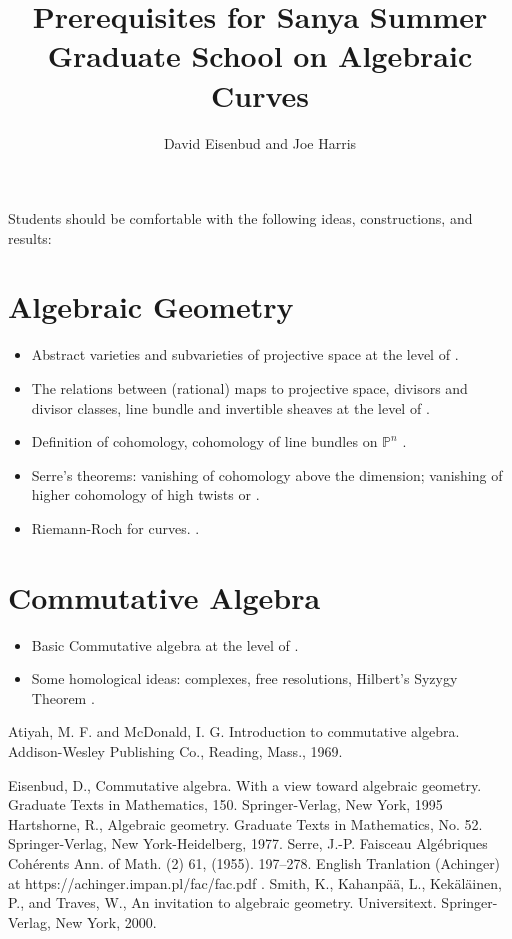 \documentclass[12pt, leqno]{report}
\title{Prerequisites for Sanya Summer Graduate School on Algebraic Curves}
\author{ David Eisenbud and Joe Harris}
\makeatletter
\def\PP{{\mathbb P}}
\def@{\mskip1.5mu} %
\makeatother
\begin{document}
\maketitle

\setcounter{page}{5}

Students should be comfortable with the following ideas, constructions, and results:

\section*{Algebraic Geometry}

\begin{itemize}
\item Abstract varieties and subvarieties of projective space at the level of \cite[Chapters 1--3 ]{S}.
\item The relations between (rational) maps to projective space, divisors and divisor classes, line bundle and invertible sheaves at the level of \cite[Chapter 8 and Appendix]{S}.
\item Definition of cohomology, cohomology of line bundles on $\PP^{n}$ \cite{FAC}.
\item Serre's theorems: vanishing of cohomology above the dimension; vanishing of higher cohomology of high twists \cite{FAC} or \cite[Ch 3]{H}.
\item Riemann-Roch for curves. \cite[Section IV.1]{H}.
\end{itemize}

\section*{Commutative Algebra}
\begin{itemize}
\item Basic Commutative algebra at the level of \cite{A}.
\item Some homological ideas: complexes, free resolutions,  Hilbert's Syzygy Theorem \cite[Chapter 1]{E}.
\end{itemize}

\begin{thebibliography}{99}
 Atiyah, M. F. and McDonald, I. G. Introduction to commutative algebra. Addison-Wesley Publishing Co., Reading, Mass., 1969.

 Eisenbud, D., Commutative algebra. With a view toward algebraic geometry. Graduate Texts in Mathematics, 150. Springer-Verlag, New York, 1995
 Hartshorne, R., Algebraic geometry. Graduate Texts in Mathematics, No. 52. Springer-Verlag, New York-Heidelberg, 1977.
 Serre, J.-P. Faisceau Alg\'ebriques Coh\'erents
Ann. of Math. (2) 61, (1955). 197--278. English Tranlation (Achinger) at https://achinger.impan.pl/fac/fac.pdf .
 Smith, K., Kahanp\"a\"a, L., Kek\"al\"ainen, P., and Traves, W., An invitation to algebraic geometry. Universitext. Springer-Verlag, New York, 2000.
\end{thebibliography}
\end{document}
